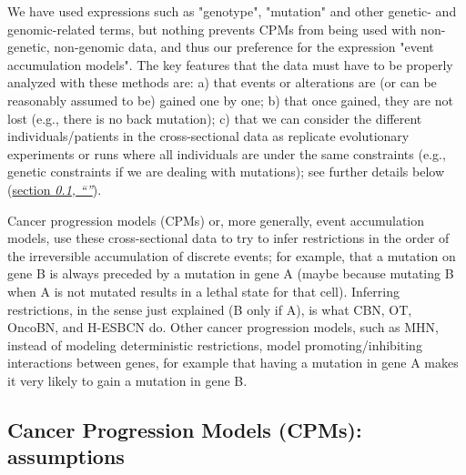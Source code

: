 \documentclass[a4paper,11pt]{article}
\newcommand*{\qrefS}[1]{\hyperref[{#1}]{section \textit{\ref*{#1},
      ``\nameref*{#1}''}}}
\begin{document}
We have used expressions such as "genotype", "mutation" and other genetic- and genomic-related terms, but nothing prevents CPMs from being used with non-genetic, non-genomic data, and thus our preference for the expression "event accumulation models". The key features that the data must have to be properly analyzed with these methods are: a) that events or alterations are (or can be reasonably assumed to be) gained one by one; b) that once gained, they are not lost (e.g., there is no back mutation); c) that we can consider the different individuals/patients in the cross-sectional data as replicate evolutionary experiments or runs where all individuals are under the same constraints (e.g., genetic constraints if we are dealing with mutations); see further details below (\qrefS{assumpt}).


Cancer progression models (CPMs) or, more generally, event accumulation models, use these cross-sectional data to try to infer restrictions in the order of the irreversible accumulation of discrete events; for example, that a mutation on gene B is always preceded by a mutation in gene A (maybe because mutating B when A is not mutated results in a lethal state for that cell). Inferring restrictions, in the sense just explained (B only if A), is what CBN, OT, OncoBN, and H-ESBCN do. Other cancer progression models, such as MHN, instead of modeling deterministic restrictions, model promoting/inhibiting interactions between genes, for example that having a mutation in gene A makes it very likely to gain a mutation in gene B. 



\subsection{Cancer Progression Models (CPMs): assumptions}\label{assumpt}
\end{document}
